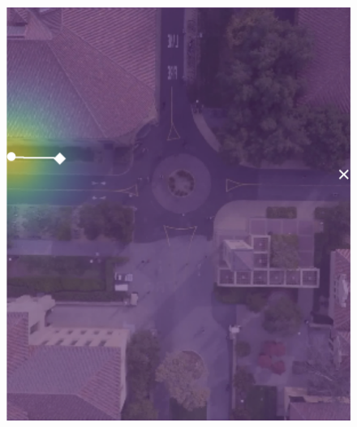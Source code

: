 \documentclass[letterpaper,10pt,conference]{ieeeconf}
\begin{document}
\begin{figure}
\vspace{0.5cm}
\begin{minipage}[t]{0.5cm}
\end{minipage}
\begin{minipage}[t]{0.3\linewidth}
	\includegraphics[width=\linewidth]{./figures/comparison/rand_death_1_2_t=70.png}
\end{minipage}
\begin{minipage}[t]{0.3\linewidth}

\end{minipage}
\end{figure}
\end{document}
